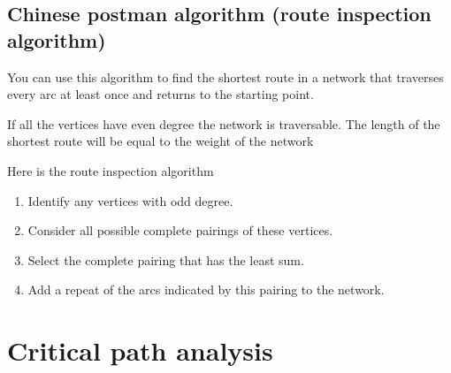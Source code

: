 \documentclass[a4paper]{article}
\begin{document}
\subsection{Chinese postman algorithm (route inspection algorithm)}
You can use this algorithm to find the shortest route in a network that traverses every arc at least once and returns to the starting point.
\begin{prop}
	If all the vertices have even degree the network is traversable. The length of the shortest route will be equal to the weight of the network
\end{prop}
\begin{eg}

\end{eg}
\begin{prop}

\end{prop}
\begin{eg}

\end{eg}
\begin{eg}

\end{eg}

\begin{defi}
	Here is the route inspection algorithm
	\begin{enumerate}
		\item Identify any vertices with odd degree.
		\item Consider all possible complete pairings of these vertices.
		\item Select the complete pairing that has the least sum.
		\item Add a repeat of the arcs indicated by this pairing to the network.
	\end{enumerate}
\end{defi}

\begin{eg}

\end{eg}


\section{Critical path analysis}
\end{document}

